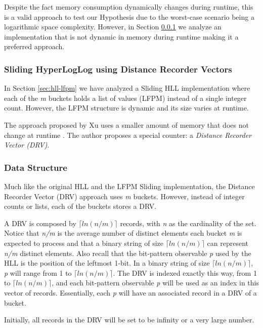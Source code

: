 Despite the fact memory consumption dynamically changes during runtime, this is a valid approach to test our Hypothesis due to the worst-case scenario being a logarithmic space complexity. However, in Section \ref{sec:hll-drv} we analyze an implementation that is not dynamic in memory during runtime making it a preferred approach.


\subsubsection{Sliding HyperLogLog using Distance Recorder Vectors} \label{sec:hll-drv}

In Section \ref{sec:hll-lfpm} we have analyzed a Sliding HLL implementation where each of the \textit{m} buckets holds a list of values (LFPM) instead of a single integer count. However, the LFPM structure is dynamic and its size varies at runtime. 

The approach proposed by Xu uses a smaller amount of memory that does not change at runtime \cite{Xu-hll-sliding-drv}. The author proposes a special counter: a \textit{Distance Recorder Vector (DRV)}. 

\subsubsection*{Data Structure}
Much like the original HLL and the LFPM Sliding implementation, the Distance Recorder Vector (DRV) approach uses \textit{m} buckets. However, instead of integer counts or lists, each of the buckets stores a DRV. 

A DRV is composed by \textit{$\lceil ln(n/m) \rceil$} records, with \textit{n} as the cardinality of the set. Notice that \textit{n/m} is the average number of distinct elements each bucket \textit{m} is expected to process and that a binary string of size \textit{$\lceil ln(n/m) \rceil$} can represent \textit{n/m} distinct elements. Also recall that the bit-pattern observable \textit{p} used by the HLL is the position of the leftmost 1-bit. In a binary string of size \textit{$\lceil ln(n/m) \rceil$}, \textit{p} will range from 1 to \textit{$\lceil ln(n/m) \rceil$}. The DRV is indexed exactly this way, from 1 to \textit{$\lceil ln(n/m) \rceil$}, and each bit-pattern observable \textit{p} will be used as an index in this vector of records. Essentially, each \textit{p} will have an associated record in a DRV of a bucket.

Initially, all records in the DRV will be set to be infinity or a very large number.

